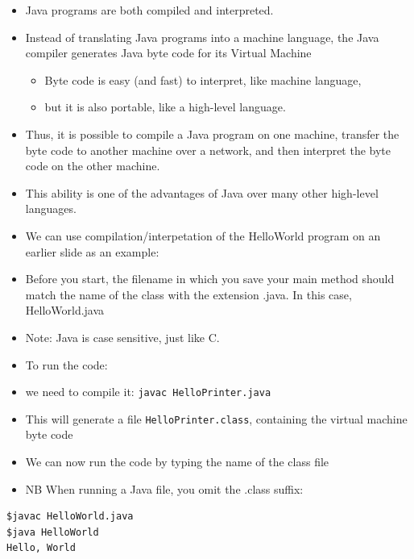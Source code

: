 \documentclass{beamer}
\begin{document}
\begin{frame}
\begin{itemize}
\item Java programs are both compiled and
interpreted.  
\item Instead of translating Java programs into a 
machine language, the Java compiler generates Java byte code for its \alert{Virtual Machine}
\begin{itemize}
\item Byte code is easy (and fast) to interpret, like machine language,
\item but it is also portable, like a high-level language.  
\end{itemize}
\item Thus, it is possible to compile a Java program on one machine,
transfer the byte code to another machine over a network,
and then interpret the byte code on the other machine.  
\item This ability is one of the advantages of Java over many other
high-level languages.
\end{itemize}
\end{frame}

\begin{frame}[fragile]
\begin{itemize}
\item We can use compilation/interpetation of the HelloWorld program on an earlier slide as an example:
\item Before you start, the filename in which you save your main method should match the name of the class with the extension .java. In this case, HelloWorld.java
\item Note: Java is \alert{case sensitive}, just like C.
\end{itemize}
\end{frame}

\begin{frame}[fragile]
\begin{itemize}
\item To run the code:
\item we need to compile it: \lstinline!javac HelloPrinter.java!
\item This will generate a file \lstinline!HelloPrinter.class!, containing the virtual machine byte code
\item We can now run the code by typing the name of the class file
\item NB When running a Java file, you omit the .class suffix:
\end{itemize}
\begin{block}{}
\begin{lstlisting}
$javac HelloWorld.java
$java HelloWorld
Hello, World
\end{lstlisting}
\end{block}

\end{frame}
\end{document}
